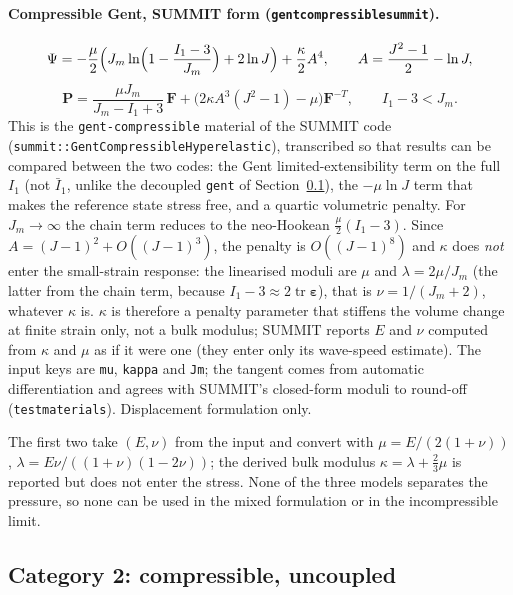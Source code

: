\documentclass[11pt]{article}
\newcommand{\tr}{\operatorname{tr}}
\newcommand{\beps}{\bm{\varepsilon}}
\newcommand{\bP}{\bm{P}}
\newcommand{\bF}{\bm{F}}
\newcommand{\Ione}{I_1}
\newcommand{\Ib}{\bar{I}_1}
\DeclareRobustCommand{\code}[1]{{\def\_{\textunderscore\allowbreak}\texttt{#1}}}
\DeclareRobustCommand{\file}[1]{{\def\_{\textunderscore\allowbreak}\texttt{#1}}}
\begin{document}
\paragraph{Compressible Gent, SUMMIT form (\code{gent\_compressible\_summit}).}
\begin{equation}
  \Psi = -\frac{\mu}{2}\Bigl(J_m\ln\Bigl(1 - \frac{\Ione - 3}{J_m}\Bigr) + 2\ln J\Bigr)
         + \frac{\kappa}{2}A^4,
  \qquad
  A = \frac{J^2 - 1}{2} - \ln J,
  \label{eq:gentsummit}
\end{equation}
\begin{equation}
  \bP = \frac{\mu J_m}{J_m - \Ione + 3}\,\bF
        + \bigl(2\kappa A^3(J^2 - 1) - \mu\bigr)\bF^{-T},
  \qquad \Ione - 3 < J_m .
\end{equation}
This is the \code{gent-compressible} material of the SUMMIT code
(\code{summit::GentCompressibleHyperelastic}), transcribed so that results
can be compared between the two codes: the Gent limited-extensibility term
on the full $\Ione$ (not $\Ib$, unlike the decoupled \code{gent} of
Section~\ref{sec:split}), the $-\mu\ln J$ term that makes the reference
state stress free, and a quartic volumetric penalty.  For $J_m \to \infty$
the chain term reduces to the neo-Hookean $\tfrac{\mu}{2}(\Ione - 3)$.
Since $A = (J-1)^2 + O((J-1)^3)$, the penalty is $O((J-1)^8)$ and $\kappa$
does \emph{not} enter the small-strain response: the linearised moduli are
$\mu$ and $\lambda = 2\mu/J_m$ (the latter from the chain term, because
$\Ione - 3 \approx 2\tr\beps$), that is $\nu = 1/(J_m + 2)$, whatever
$\kappa$ is.  $\kappa$ is therefore a penalty parameter that stiffens the
volume change at finite strain only, not a bulk modulus; SUMMIT reports
$E$ and $\nu$ computed from $\kappa$ and $\mu$ as if it were one (they enter
only its wave-speed estimate).  The input keys are \code{mu}, \code{kappa}
and \code{Jm}; the tangent comes from automatic differentiation and agrees
with SUMMIT's closed-form moduli to round-off (\file{test\_materials}).
Displacement formulation only.

The first two take $(E, \nu)$ from the input and convert with
$\mu = E/(2(1+\nu))$, $\lambda = E\nu/((1+\nu)(1-2\nu))$; the derived bulk
modulus $\kappa = \lambda + \tfrac23\mu$ is reported but does not enter the
stress.  None of the three models separates the pressure, so none can be
used in the mixed formulation or in the incompressible limit.

\subsection{Category 2: compressible, uncoupled}
\label{sec:split}
\end{document}

